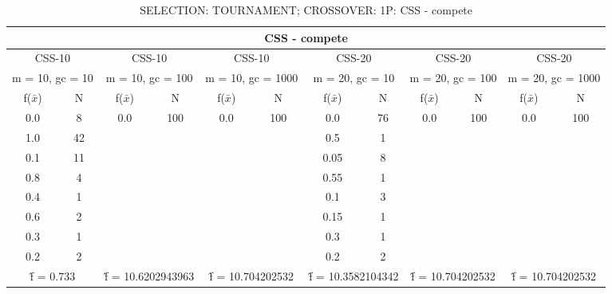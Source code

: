 \begin{table}[H]
	\centering
	\caption{SELECTION: TOURNAMENT; CROSSOVER: 1P: CSS - compete}
	\begin{adjustbox}{width=1\textwidth}
		\begin{tabular}{ |c|c||c|c||c|c||c|c||c|c||c|c| }
			\hline
			\multicolumn{12}{|c|}{CSS - compete} \\
			\hline
			\multicolumn{2}{|c||}{CSS-10} & \multicolumn{2}{c||}{CSS-10} & \multicolumn{2}{c||}{CSS-10} & \multicolumn{2}{c||}{CSS-20} & \multicolumn{2}{c||}{CSS-20} & \multicolumn{2}{c|}{CSS-20}\\
			\hline
			\multicolumn{2}{|c||}{m = 10, gc = 10} & \multicolumn{2}{c||}{m = 10, gc = 100} & \multicolumn{2}{c||}{m = 10, gc = 1000} & \multicolumn{2}{c||}{m = 20, gc = 10} & \multicolumn{2}{c||}{m = 20, gc = 100} & \multicolumn{2}{c|}{m = 20, gc = 1000}\\
			\hline
			f($\bar{x}$) & N & f($\bar{x}$) & N & f($\bar{x}$) & N & f($\bar{x}$) & N & f($\bar{x}$) & N & f($\bar{x}$) & N\\
			\hline
			\hline
			0.0 & 8 & 0.0 & 100 & 0.0 & 100 & 0.0 & 76 & 0.0 & 100 & 0.0 & 100\\
			1.0 & 42 &   &   &   &   & 0.5 & 1 &   &   &   &  \\
			0.1 & 11 &   &   &   &   & 0.05 & 8 &   &   &   &  \\
			0.8 & 4 &   &   &   &   & 0.55 & 1 &   &   &   &  \\
			0.4 & 1 &   &   &   &   & 0.1 & 3 &   &   &   &  \\
			0.6 & 2 &   &   &   &   & 0.15 & 1 &   &   &   &  \\
			0.3 & 1 &   &   &   &   & 0.3 & 1 &   &   &   &  \\
			0.2 & 2 &   &   &   &   & 0.2 & 2 &   &   &   &  \\
			\hline
			\multicolumn{2}{|c||}{\^{f} = 0.733} & \multicolumn{2}{c||}{\^{f} = 10.6202943963} & \multicolumn{2}{c||}{\^{f} = 10.704202532} & \multicolumn{2}{c||}{\^{f} = 10.3582104342} & \multicolumn{2}{c||}{\^{f} = 10.704202532} & \multicolumn{2}{c|}{\^{f} = 10.704202532}\\
			\hline
		\end{tabular}
	\end{adjustbox}
\end{table}
